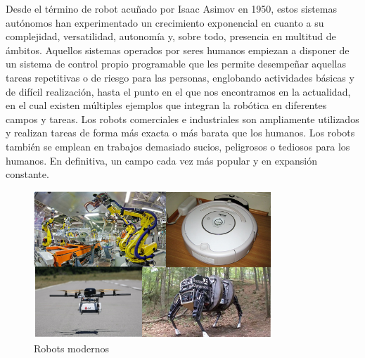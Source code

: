 Desde el término de robot acuñado por Isaac Asimov en 1950, estos sistemas autónomos han experimentado un crecimiento exponencial en cuanto a su complejidad, versatilidad, autonomía y, sobre todo, presencia en multitud de ámbitos. Aquellos sistemas operados por seres humanos empiezan a disponer de un sistema de control propio programable que les permite desempeñar aquellas tareas repetitivas o de riesgo para las personas, englobando actividades básicas y de difícil realización, hasta el punto en el que nos encontramos en la actualidad, en el cual existen múltiples ejemplos que integran la robótica en diferentes campos y tareas. Los robots comerciales e industriales son ampliamente utilizados y realizan tareas de forma más exacta o más barata que los humanos. Los robots también se emplean en trabajos demasiado sucios, peligrosos o tediosos para los humanos. En definitiva, un campo cada vez más popular y en expansión constante.

\begin{figure}[H]
  \begin{center}
    \includegraphics[width=0.8\textwidth]{figures/robots.png}
		\caption{Robots modernos}
		\label{fig.robots}
		\end{center}
\end{figure}


